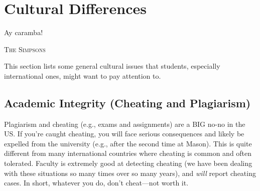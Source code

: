 \documentclass[oneside,11pt,dvipsnames]{book}
\begin{document}



\chapter{Cultural Differences}\label{sec:cultural}

\epigraph{\vspace{-0.2in} Ay caramba!}{\textsc{The Simpsons}}


This section lists some general cultural issues that students, especially international ones, might want to pay attention to.



\section{Academic Integrity (Cheating and Plagiarism)}

Plagiarism and cheating (e.g., exams and assignments) are a BIG no-no in the US.  If you're caught cheating, you will face serious consequences and likely be expelled from the university (e.g., after the second time at Mason).   This is quite different from many international countries where cheating is common and often tolerated.  Faculty is extremely good at detecting cheating (we have been dealing with these situations so many times over so many years), and \emph{will} report cheating cases.  In short, whatever you do, don't cheat---not worth it.
\end{document}
